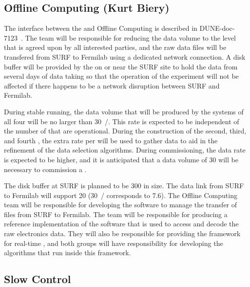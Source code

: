 \subsection{Offline Computing (Kurt Biery)}
\label{sec:fd-daq-intfc-fnal-cmptg}

The interface between the  and Offline Computing is
described in DUNE-doc-7123~\cite{docdb7123}.
The  team will be responsible for reducing the data volume
to the level that is agreed upon by all interested parties, and the
raw data files will be transfered from SURF to Fermilab using a
dedicated network connection.
A disk buffer will be provided by the  on or near the SURF
site to hold the data from several days of data taking so that the
operation of the experiment will not be affected if there happens to
be a network disruption between SURF and Fermilab.

During stable running, the data volume that will be produced by the
 systems of all four  will be no larger
than \SI{30}{\PB/\year}.
This rate is expected to be independent of the number of
 that are operational.
During the construction of the second, third, and fourth
, the extra rate per  will be used
to gather data to aid in the refinement of the data selection
algorithms.
During commissioning, the data rate is expected to be higher, and it
is anticipated that a data volume of \SI{30}{\PB} will be necessary to
commission a .

The disk buffer at SURF is planned to be \SI{300}{\TB} in size.
The data link from SURF to Fermilab will support \SI{20}{\Gbps}
(\SI{30}{\PB/\year} corresponds to \SI{7.6}{\Gbps}).
The Offline Computing team will be responsible for developing the
software to manage the transfer of files from SURF to Fermilab.
The  team will be responsible for producing a reference
implementation of the software that is used to access and decode the
raw electronics data.
They will also be responsible for providing the framework for
real-time , and both groups will have responsibility for
developing the  algorithms that run inside this framework.

\subsection{Slow Control}
\label{sec:fd-daq-intfc-sc}
\label{sec:fd-daq-intfc-sc}

